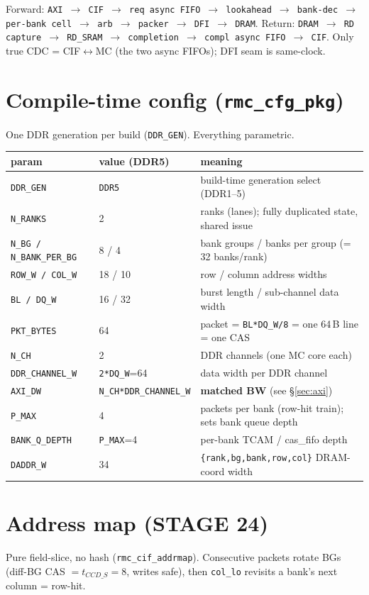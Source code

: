 \documentclass[10pt]{article}
\newcommand{\sig}[1]{\texttt{\small #1}}
\newcommand{\blk}[1]{\textbf{#1}}
\begin{document}
\noindent Forward: \sig{AXI $\to$ CIF $\to$ req async FIFO $\to$ lookahead $\to$ bank-dec $\to$
per-bank cell $\to$ arb $\to$ packer $\to$ DFI $\to$ DRAM}. Return: \sig{DRAM $\to$ RD capture $\to$
RD_SRAM $\to$ completion $\to$ compl async FIFO $\to$ CIF}. Only true CDC = CIF$\leftrightarrow$MC
(the two async FIFOs); DFI seam is same-clock.

\section{Compile-time config (\texttt{rmc\_cfg\_pkg})}
One DDR generation per build (\sig{DDR_GEN}). Everything parametric.
\begin{longtable}{P{3.2cm} P{3.0cm} P{8.0cm}}
\toprule
\blk{param} & \blk{value (DDR5)} & \blk{meaning}\\ \midrule \endhead
\sig{DDR_GEN} & \sig{DDR5} & build-time generation select (DDR1--5)\\
\sig{N_RANKS} & 2 & ranks (lanes); fully duplicated state, shared issue\\
\sig{N_BG / N_BANK_PER_BG} & 8 / 4 & bank groups / banks per group (= 32 banks/rank)\\
\sig{ROW_W / COL_W} & 18 / 10 & row / column address widths\\
\sig{BL / DQ_W} & 16 / 32 & burst length / sub-channel data width\\
\sig{PKT_BYTES} & 64 & packet = \sig{BL*DQ_W/8} = one 64\,B line = one CAS\\
\sig{N_CH} & 2 & DDR channels (one MC core each)\\
\sig{DDR_CHANNEL_W} & \sig{2*DQ_W}=64 & data width per DDR channel\\
\sig{AXI_DW} & \sig{N_CH*DDR_CHANNEL_W} & \textbf{matched BW} (see \S\ref{sec:axi})\\
\sig{P_MAX} & 4 & packets per bank (row-hit train); sets bank queue depth\\
\sig{BANK_Q_DEPTH} & \sig{P_MAX}=4 & per-bank TCAM / cas\_fifo depth\\
\sig{DADDR_W} & 34 & \sig{\{rank,bg,bank,row,col\}} DRAM-coord width\\
\bottomrule
\end{longtable}

\section{Address map (STAGE 24)}
Pure field-slice, no hash (\sig{rmc\_cif\_addrmap}). Consecutive packets rotate BGs
(diff-BG CAS $=t_{CCD\_S}=8$, writes safe), then \sig{col_lo} revisits a bank's next column = row-hit.
\end{document}
